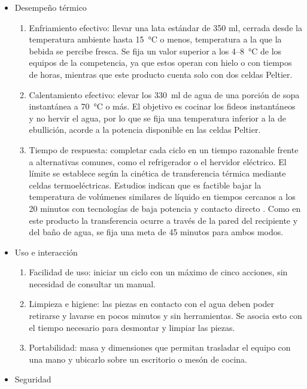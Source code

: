 \documentclass[12pt, a4paper]{article}
\begin{document}
\begin{itemize}
    \item Desempeño térmico
    \begin{enumerate}
        \item Enfriamiento efectivo: llevar una lata estándar de 350 ml, cerrada desde la temperatura ambiente hasta \SI{15}{\celsius} o menos, temperatura a la que la bebida se percibe fresca. Se fija un valor superior a los 4--\SI{8}{\celsius} de los equipos de la competencia, ya que estos operan con hielo o con tiempos de horas, mientras que este producto cuenta solo con dos celdas Peltier.
        \item Calentamiento efectivo: elevar los \SI{330}{\ml} de agua de una porción de sopa instantánea a \SI{70}{\celsius} o más. El objetivo es cocinar los fideos instantáneos y no hervir el agua, por lo que se fija una temperatura inferior a la de ebullición, acorde a la potencia disponible en las celdas Peltier.
        \item Tiempo de respuesta: completar cada ciclo en un tiempo razonable frente a alternativas comunes, como el refrigerador o el hervidor eléctrico. El límite se establece según la cinética de transferencia térmica mediante celdas termoeléctricas. Estudios indican que es factible bajar la temperatura de volúmenes similares de líquido en tiempos cercanos a los 20 minutos con tecnologías de baja potencia y contacto directo \parencite{peltierpower}. Como en este producto la transferencia ocurre a través de la pared del recipiente y del baño de agua, se fija una meta de 45 minutos para ambos modos.
    \end{enumerate}
    \item Uso e interacción
    \begin{enumerate}
        \item Facilidad de uso: iniciar un ciclo con un máximo de cinco acciones, sin necesidad de consultar un manual.
        \item Limpieza e higiene: las piezas en contacto con el agua deben poder retirarse y lavarse en pocos minutos y sin herramientas. Se asocia esto con el tiempo necesario para desmontar y limpiar las piezas.
        \item Portabilidad: masa y dimensiones que permitan trasladar el equipo con una mano y ubicarlo sobre un escritorio o mesón de cocina.
    \end{enumerate}
    \item Seguridad
    \begin{enumerate}

\end{enumerate}
\end{itemize}
\end{document}
